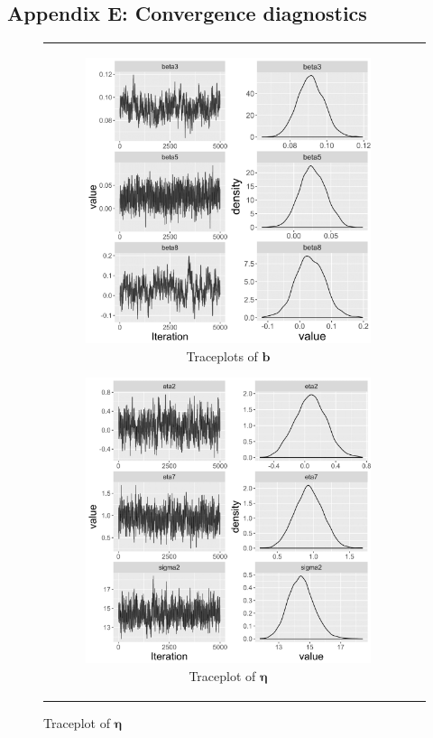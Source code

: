 \documentclass[ba]{imsart}
\numberwithin{equation}{section}
\theoremstyle{plain}
\begin{document}
		\subsection*{Appendix E: Convergence diagnostics}\label{appendix: convergence}
		\begin{figure}[H]
			\centering
			\begin{tabular}[t]{cc}
				\begin{subfigure}[b]{0.495\textwidth}
					\caption{Traceplots of $\boldsymbol{b}$}
					\includegraphics[width=\textwidth]{img/betatrace-1.png}	
				\end{subfigure}
				\begin{subfigure}[b]{0.495\textwidth}
					\caption{Traceplot of $\boldsymbol{\eta}$}
					\includegraphics[width=\textwidth]{img/etatrace-1.png}	

\end{subfigure}
\end{tabular}
\end{figure}
\end{document}
